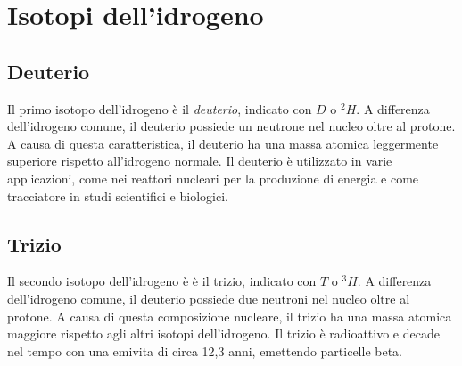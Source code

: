 \documentclass[a4paper]{article}
\begin{document}




\pagebreak




\section{Isotopi dell'idrogeno}

\subsection{Deuterio}

Il primo isotopo dell'idrogeno è il \textit{deuterio}, indicato con \(D\) o \(^2H\).
A differenza dell'idrogeno comune, il deuterio possiede un neutrone nel nucleo oltre al protone.
A causa di questa caratteristica, il deuterio ha una massa atomica leggermente superiore rispetto all'idrogeno normale.
Il deuterio è utilizzato in varie applicazioni, come nei reattori nucleari per la produzione di energia e come tracciatore in studi scientifici e biologici. 

\subsection{Trizio}

Il secondo isotopo dell'idrogeno è è il trizio, indicato con \(T\) o \(^3H\).
A differenza dell'idrogeno comune, il deuterio possiede due neutroni nel nucleo oltre al protone.
A causa di questa composizione nucleare, il trizio ha una massa atomica maggiore rispetto agli altri isotopi dell'idrogeno.
Il trizio è radioattivo e decade nel tempo con una emivita di circa 12,3 anni, emettendo particelle beta.
\end{document}
